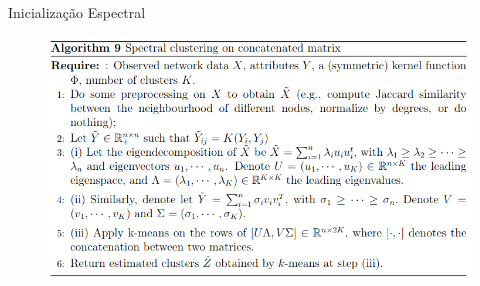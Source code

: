 \documentclass[aspectratio=169]{beamer}
\begin{document}
\begin{frame}{Inicialização Espectral}
	\begin{figure}
		\centering
		\includegraphics[scale=0.4]{img/spectral_init.png}
	\end{figure}
\end{frame}
\end{document}
